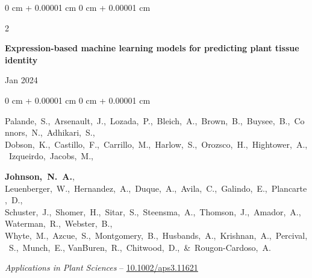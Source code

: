 \documentclass[10pt, letterpaper]{article}
\newenvironment{onecolentry}{
    \begin{adjustwidth}{
        0 cm + 0.00001 cm
    }{
        0 cm + 0.00001 cm
    }
}{
    \end{adjustwidth}
} %
\newenvironment{twocolentry}[2][]{
    \onecolentry
    \def\secondColumn{#2}
    \setcolumnwidth{\fill, 4.5 cm}
    \begin{paracol}{2}
}{
    \switchcolumn \raggedleft \secondColumn
    \end{paracol}
    \endonecolentry
} %
\begin{document}
        \vspace{0.2 cm}

        
        \begin{samepage}
            \begin{twocolentry}{
                Jan 2024
                }
                \textbf{Expression-based machine learning models for predicting plant tissue identity}
            \end{twocolentry}

            \vspace{0.10 cm}
            
            \begin{onecolentry}
                \mbox{Palande, S., Arsenault, J., Lozada, P., Bleich, A., Brown, B., Buysee, B., Connors, N., Adhikari, S.,}
                \mbox{Dobson, K., Castillo, F., Carrillo, M., Harlow, S., Orozsco, H., Hightower, A., Izqueirdo, Jacobs, M.,}
                
                \mbox{\textbf{Johnson, N. A.}},
                \mbox{Leuenberger, W., Hernandez, A., Duque, A., Avila, C., Galindo, E., Plancarte, D.,}
                \mbox{Schuster, J., Shomer, H., Sitar, S., Steensma, A., Thomson, J., Amador, A., Waterman, R., Webster, B.,} 
                \mbox{Whyte, M., Azcue, S., Montgomery, B., Husbands, A., Krishnan, A., Percival, S., Munch, E.,}
                \mbox{VanBuren, R., Chitwood, D., \& Rougon-Cardoso, A.}

                \vspace{0.10 cm}
                
                \textit{Applications in Plant Sciences} -- \href{https://doi.org/10.1002/aps3.11621}{10.1002/aps3.11621}
            \end{onecolentry}
        \end{samepage}


        \vspace{0.2 cm}
        
\end{document}
